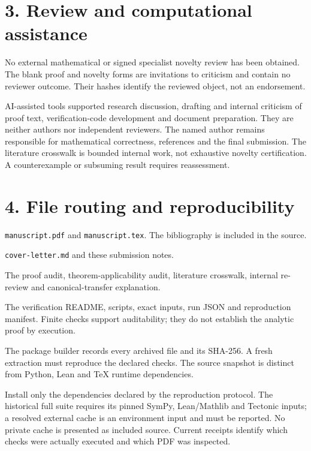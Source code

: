 \documentclass[11pt]{article}
\begin{document}
\newpage
\section*{3. Review and computational assistance}
No external mathematical or signed specialist novelty review has been obtained.
The blank proof and novelty forms are invitations to criticism and contain no
reviewer outcome. Their hashes identify the reviewed object, not an endorsement.

AI-assisted tools supported research discussion, drafting and internal criticism
of proof text, verification-code development and document preparation. They
are neither authors nor independent reviewers. The named author remains
responsible for mathematical correctness, references and the final submission.
The literature crosswalk is bounded internal work, not exhaustive novelty
certification. A counterexample or subsuming result requires reassessment.

\section*{4. File routing and reproducibility}
\begin{description}[style=nextline,leftmargin=0pt]
\item[Main manuscript] \texttt{manuscript.pdf} and \texttt{manuscript.tex}.
The bibliography is included in the source.
\item[Editor material] \texttt{cover-letter.md} and these submission notes.
\item[Scientific supplement] The proof audit, theorem-applicability audit,
literature crosswalk, internal re-review and canonical-transfer explanation.
\item[Verification] The verification README, scripts, exact inputs, run JSON
and reproduction manifest. Finite checks support auditability; they do not
establish the analytic proof by execution.
\item[Transport identity] The package builder records every archived file and
its SHA-256. A fresh extraction must reproduce the declared checks. The
source snapshot is distinct from Python, Lean and TeX runtime dependencies.
\end{description}

Install only the dependencies declared by the reproduction protocol. The
historical full suite requires its pinned SymPy, Lean/Mathlib and Tectonic
inputs; a resolved external cache is an environment input and must be
reported. No private cache is presented as included source. Current receipts
identify which checks were actually executed and which PDF was inspected.
\end{document}
